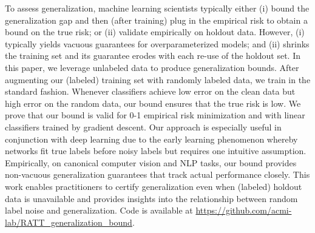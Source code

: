 To assess generalization, 
machine learning scientists typically either
(i) bound the generalization gap 
and then (after training) 
plug in the empirical risk 
to obtain a bound on the true risk; 
or (ii) validate empirically on holdout data.
However, (i) typically yields vacuous guarantees 
for overparameterized models;
and (ii) shrinks the training set
and its guarantee erodes
with each re-use of the holdout set.
In this paper, 
we leverage unlabeled data
to produce generalization bounds. 
After augmenting our (labeled) training set
with randomly labeled data,
we train in the standard fashion.
Whenever classifiers achieve 
low error on the clean data
but high error on the random data,
our bound ensures that the true risk is low.
We prove that our bound is valid 
for 0-1 empirical risk minimization 
and with linear classifiers
trained by gradient descent. 
Our approach is especially useful 
in conjunction with deep learning
due to the early learning phenomenon 
whereby networks fit true labels 
before noisy labels
but requires one intuitive assumption.
Empirically, on canonical computer vision and NLP tasks, 
our bound provides non-vacuous generalization guarantees
that track actual performance closely.
This work 
enables practitioners to certify generalization
even when (labeled) holdout data is unavailable 
and provides insights into the relationship 
between random label noise and generalization. 
Code is available at 
\href{https://github.com/acmi-lab/RATT\_generalization\_bound}{https://github.com/acmi-lab/RATT\_generalization\_bound}.





% 
% 

